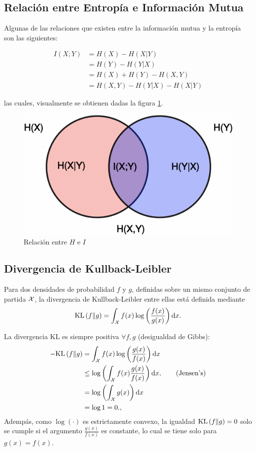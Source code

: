 \subsection{Relación entre Entropía e Información Mutua}

Algunas de las relaciones que existen entre la información mutua y la entropía son las siguientes:

\begin{align*}
    I(X;Y)&= H(X)-H(X|Y)\\
    &= H(Y)-H(Y|X)\\
    &= H(X)+H(Y)-H(X,Y)\\
    &= H(X,Y)-H(Y|X)-H(X|Y)
\end{align*}

las cuales, visualmente se obtienen dadas la figura \ref{fig:relationentropy}.

\begin{figure}[ht]
    \centering
    \includegraphics[width=0.7\columnwidth]{img/relationentropy.png}
    \caption{Relación entre $H$ e $I$}
    \label{fig:relationentropy}
\end{figure}

\subsection{Divergencia de Kullback-Leibler}

\begin{definition}
Para dos densidades de probabilidad $f$ y $g$, definidas sobre un mismo conjunto de partida ${\mathcal X}$, la divergencia de Kullback-Leibler entre ellas está definida mediante 
\begin{equation}
	\text{KL}\left(f\middle\|g\right) = \int_{\mathcal X} f(x)\log\left(\frac{f(x)}{g(x)}\right){\text{d}x}.
\end{equation}
\end{definition}

\begin{remark} La divergencia KL es siempre positiva $\forall f,g$ (desigualdad de Gibbs):
\begin{align*}
 	-\text{KL}\left(f\middle\|g\right)  &= \int_{\mathcal X} f(x)\log\left(\frac{g(x)}{f(x)}\right){\text{d}x}\\
 				&\leq \log\left(\int_{\mathcal X} f(x)\frac{g(x)}{f(x)}\right){\text{d}x}, \quad\quad \text{(Jensen's)}\\
 				&= \log\left(\int_{\mathcal X} g(x)\right){\text{d}x}\\
 				&=\log 1=0.,	
 \end{align*} 
Adempás, como $\log(\cdot)$ es estrictamente convexo, la igualdad $\text{KL}\left(f\middle\|g\right)=0$ solo se cumple si el argumento $\frac{g(x)}{f(x)}$ es constante, lo cual se tiene solo para ${g(x)} = {f(x)}$.
\end{remark}

